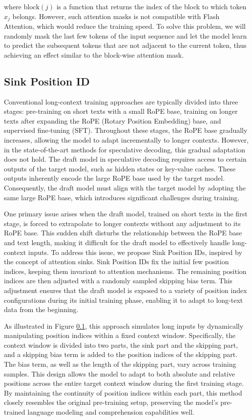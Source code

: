where $\mathrm{block}(j)$ is a function that returns the index of the block to which token $x_j$ belongs. However, such attention masks is not compatible with Flash Attention, which would reduce the training speed. To solve this problem, we will randomly mask the last few tokens of the input sequence and let the model learn to predict the subsequent tokens that are not adjacent to the current token, thus achieving an effect similar to the block-wise attention mask.

\subsection{Sink Position ID}
Conventional long-context training approaches are typically divided into three stages: pre-training on short texts with a small RoPE base, training on longer texts after expanding the RoPE (Rotary Position Embedding) base, and supervised fine-tuning (SFT). Throughout these stages, the RoPE base gradually increases, allowing the model to adapt incrementally to longer contexts. However, in the state-of-the-art methods for speculative decoding, this gradual adaptation does not hold. The draft model in speculative decoding requires access to certain outputs of the target model, such as hidden states or key-value caches. These outputs inherently encode the large RoPE base used by the target model. Consequently, the draft model must align with the target model by adopting the same large RoPE base, which introduces significant challenges during training.

One primary issue arises when the draft model, trained on short texts in the first stage, is forced to extrapolate to longer contexts without any adjustment to its RoPE base. This sudden shift disturbs the relationship between the RoPE base and text length, making it difficult for the draft model to effectively handle long-context inputs. To address this issue, we propose Sink Position IDs, inspired by the concept of attention sinks. Sink Position IDs fix the initial few position indices, keeping them invariant to attention mechanisms. The remaining position indices are then adjusted with a randomly sampled skipping bias term. This adjustment ensures that the draft model is exposed to a variety of position index configurations during its initial training phase, enabling it to adapt to long-text data from the beginning.

As illustrated in Figure \ref{}, this approach simulates long inputs by dynamically manipulating position indices within a fixed context window. Specifically, the context window is divided into two parts, the sink part and the skipping part, and a skipping bias term is added to the position indices of the skipping part. The bias term, as well as the length of the skipping part, vary across training samples. This design allows the model to adapt to both absolute and relative positions across the entire target context window during the first training stage. By maintaining the continuity of position indices within each part, this method closely resembles the original pre-training setup, preserving the model's pre-trained language modeling and comprehension capabilities well.

